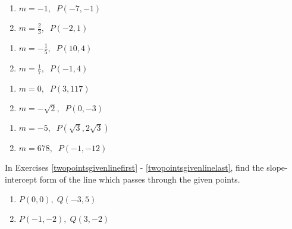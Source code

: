\begin{multicols}{2}
\begin{enumerate}
\setcounter{enumi}{\value{HW}}

\item $m = -1, \;\; P(-7, -1)$
\item $m = \frac{2}{3}, \;\; P(-2, 1)$

\setcounter{HW}{\value{enumi}}
\end{enumerate}
\end{multicols}

\begin{multicols}{2}
\begin{enumerate}
\setcounter{enumi}{\value{HW}}

\item $m = -\frac{1}{5}, \;\; P(10, 4)$
\item $m = \frac{1}{7}, \;\; P(-1, 4)$

\setcounter{HW}{\value{enumi}}
\end{enumerate}
\end{multicols}

\begin{multicols}{2}
\begin{enumerate}
\setcounter{enumi}{\value{HW}}

\item $m = 0, \;\; P(3, 117)$
\item $m = -\sqrt{2}, \;\; P(0, -3)$

\setcounter{HW}{\value{enumi}}
\end{enumerate}
\end{multicols}

\begin{multicols}{2}
\begin{enumerate}
\setcounter{enumi}{\value{HW}}

\item $m = -5, \;\; P(\sqrt{3}, 2\sqrt{3})$
\item $m = 678, \;\; P(-1, -12)$ \label{pointslopegivenlinelast}

\setcounter{HW}{\value{enumi}}
\end{enumerate}
\end{multicols}

In Exercises \ref{twopointsgivenlinefirst} - \ref{twopointsgivenlinelast}, find the slope-intercept form of the line which passes through the given points.

\begin{multicols}{2}
\begin{enumerate}
\setcounter{enumi}{\value{HW}}

\item $P(0, 0), \; Q(-3, 5)$ \label{twopointsgivenlinefirst}
\item $P(-1, -2), \; Q(3, -2)$

\setcounter{HW}{\value{enumi}}
\end{enumerate}
\end{multicols}

